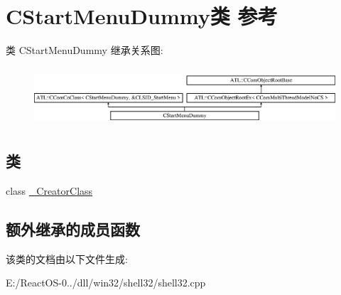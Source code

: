 \hypertarget{class_c_start_menu_dummy}{}\section{C\+Start\+Menu\+Dummy类 参考}
\label{class_c_start_menu_dummy}
类 C\+Start\+Menu\+Dummy 继承关系图\+:\begin{figure}[H]
\begin{center}
\leavevmode
\includegraphics[height=2.204725cm]{class_c_start_menu_dummy}
\end{center}
\end{figure}
\subsection*{类}
\begin{DoxyCompactItemize}
\item 
class \hyperlink{class_c_start_menu_dummy_1_1___creator_class}{\+\_\+\+Creator\+Class}
\end{DoxyCompactItemize}
\subsection*{额外继承的成员函数}


该类的文档由以下文件生成\+:\begin{DoxyCompactItemize}
\item 
E\+:/\+React\+O\+S-\/0../dll/win32/shell32/shell32.\+cpp\end{DoxyCompactItemize}
